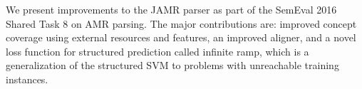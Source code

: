 We present improvements to the JAMR parser as part of the SemEval 2016 Shared Task 8 on AMR parsing. The major contributions are: improved concept coverage using external resources and features, an improved aligner, and a novel loss function for structured prediction called infinite ramp, which is a generalization of the structured SVM to problems with unreachable training instances.
